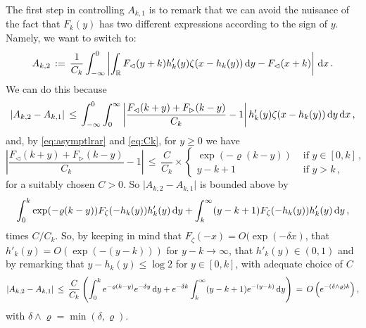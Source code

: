 \documentclass[reqno,11pt]{amsart}
\numberwithin{equation}{section}
\newcommand{\dd}{\,\text{\rm d}}             %
\newcommand{\bbR}{{\ensuremath{\mathbb R}} }
\newcommand{\gd}{\delta}
\newcommand{\gz}{\zeta}
\newcommand{\lar}{\vartriangleleft}
\newcommand{\rar}{\vartriangleright}
\begin{document}
The first step in controlling $A_{k,1}$ is to remark that we can avoid the nuisance of the fact that 
$F_k(y)$ has two different expressions according to the sign of $y$. Namely, we want to switch to:
\begin{equation}
A_{k,2}\, :=\,\frac 1{C_k}\int_{-\infty}^0 \left \vert  \int_ \bbR F_\lar(y+k) h'_k(y) \gz( x-h_k(y)) \dd y - F_\lar(x+k) \right\vert  \dd x\, .
\end{equation}
We can do this because 
\begin{equation}
\left\vert A_{k,2}-A_{k,1}\right\vert\, \le \,
\int_{-\infty}^0    \int_{0}^{\infty} \left \vert \frac{
F_\lar(k+y) + F_\rar(k-y)}{C_k}-1 \right \vert  h'_k(y) \gz( x-h_k(y)) \dd y \dd x\, ,
\end{equation}
and, by \eqref{eq:asymptlrar} and \eqref{eq:Ck}, for $y\ge 0$ we have
\begin{equation}
\left \vert \frac{F_\lar(k+y) + F_\rar(k-y)}{C_k}-1 \right \vert \,\le\, \frac{C}{C_k} \times  \begin{cases}\exp(-\varrho (k-y)) & \text{ if } y\in [0, k] \, ,
\\
y-k+1 & \text{ if } y >k\, ,
\end{cases}
\end{equation}
for a suitably chosen $C>0$. So 
 $\vert A_{k,2}-A_{k,1}\vert$ is bounded above by 
\begin{equation}
\label{eq:interm2.k}
     \int_{0}^{k}  \exp(-\varrho (k-y)) F_\gz(-h_k(y)) h'_k(y)\dd y +
   \int_{k}^{\infty} (y-k+1)  F_\gz(-h_k(y)) h'_k(y) \dd y\,,
 \end{equation}
 times $C/C_k$.
 So, by keeping in mind that $F_\zeta(-x)=O(\exp(-\gd x)$, that $h'_k(y) =O(\exp(-(y-k)))$ for $y-k \to \infty$, that  $ h'_k(y)\in (0,1)$ and by remarking that  $y-h_k(y)\le \log 2$ for $y\in [0,k]$,  with adequate choice of $C$
 \begin{equation}
  \left\vert A_{k,2}-A_{k,1}\right\vert\, \le  \,  \frac{C}{C_k} \left( 
   \int_{0}^{k}  e^{-\varrho (k-y)} e^{-\gd y} \dd y + e^{-\gd k}
   \int_{k}^{\infty} (y-k+1)   e^{-(y-k)} \dd y\right)\, =\, O\left( {e^{-(\gd \wedge \varrho) k}}\right),
  \end{equation}
  with $\gd \wedge \varrho= \min(\gd, \varrho)$.
 
\end{document}
